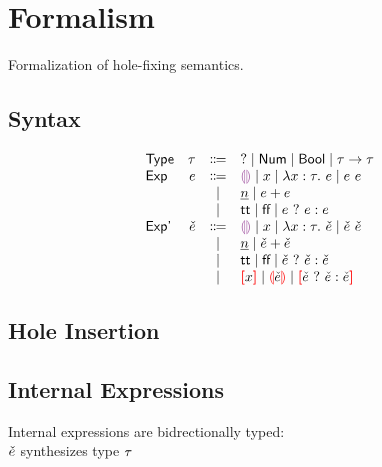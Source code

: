 \documentclass{article}
\begin{document}
\renewcommand{\thesection}{\Alph{section}}
\section{Formalism}
Formalization of hole-fixing semantics.

\subsection{Syntax}
\[\begin{array}{lrcl}
  \TMName  & \TMV  & \Coloneqq & \TUnknown \mid \TInt \mid \TBool \mid \TArrow{\TMV}{\TMV} \\
  \EMName  & \EMV  & \Coloneqq & \EEHole \mid x \mid \ELam{x}{\TMV}{\EMV} \mid \EAp{\EMV}{\EMV} \\
           &       & \mid         & \EIntMV \mid \EPlus{\EMV}{\EMV} \\
           &       & \mid         & \ETrue \mid \EFalse \mid \EIf{\EMV}{\EMV}{\EMV} \\
  \ECMName & \ECMV & \Coloneqq & \ECEHole \mid x \mid \ECLam{x}{\TMV}{\ECMV} \mid \ECAp{\ECMV}{\ECMV} \\
           &       & \mid         & \ECIntMV \mid \ECPlus{\ECMV}{\ECMV} \\
           &       & \mid         & \ECTrue \mid \ECFalse \mid \ECIf{\ECMV}{\ECMV}{\ECMV} \\
           &       & \mid         & \ECUnbound{x} \mid \ECInconType{\ECMV} \mid \ECInconBr{\ECMV}{\ECMV}{\ECMV}
\end{array}\]

\subsection{Hole Insertion}

\subsection{Internal Expressions}
Internal expressions are bidrectionally typed: \\

\judgbox{\ctxSynType{\ctx}{\ECMV}{\TMV}} $\check{e}$ synthesizes type $\tau$
\end{document}
